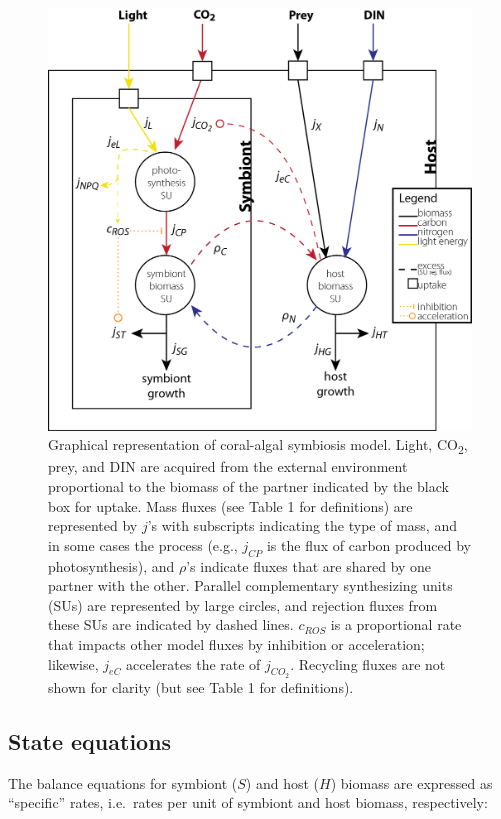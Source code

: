 \documentclass[]{elsarticle} %
\makeatletter
\def\maxwidth{\ifdim\Gin@nat@width>\linewidth\linewidth
\else\Gin@nat@width\fi}
\let\Oldincludegraphics\includegraphics
\renewcommand{\includegraphics}[1]{\Oldincludegraphics[width=\maxwidth]{#1}}
\makeatother
\begin{document}
\begin{figure}[htbp]
\centering
\includegraphics{../img/Fig1.png}
\caption{Graphical representation of coral-algal symbiosis model. Light,
CO\textsubscript{2}, prey, and DIN are acquired from the external
environment proportional to the biomass of the partner indicated by the
black box for uptake. Mass fluxes (see Table 1 for definitions) are
represented by \(j\)'s with subscripts indicating the type of mass, and
in some cases the process (e.g., \(j_{CP}\) is the flux of carbon
produced by photosynthesis), and \(\rho\)'s indicate fluxes that are
shared by one partner with the other. Parallel complementary
synthesizing units (SUs) are represented by large circles, and rejection
fluxes from these SUs are indicated by dashed lines. \(c_{ROS}\) is a
proportional rate that impacts other model fluxes by inhibition or
acceleration; likewise, \(j_{eC}\) accelerates the rate of \(j_{CO_2}\).
Recycling fluxes are not shown for clarity (but see Table 1 for
definitions).}
\end{figure}

\subsection{State equations}\label{state-equations}

The balance equations for symbiont (\(S\)) and host (\(H\)) biomass are
expressed as ``specific'' rates, i.e.~rates per unit of symbiont and
host biomass, respectively:
\end{document}
